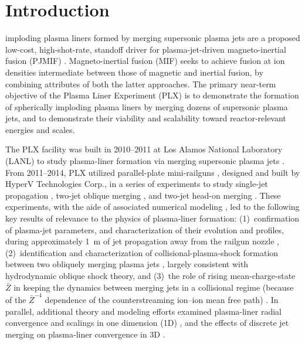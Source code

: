 \documentclass[journal]{IEEEtran}
\begin{document}
\section{Introduction}
% 
% 
% 
% 
 imploding plasma liners formed by merging supersonic
plasma jets are a proposed low-cost, high-shot-rate,
standoff driver for plasma-jet-driven magneto-inertial fusion (PJMIF) \cite{thio99,hsu12ieee,knapp14}.
Magneto-inertial fusion (MIF) \cite{lindemuth83, kirkpatrick95,lindemuth09}
seeks to achieve fusion
at ion densities intermediate between those of magnetic and inertial fusion, by combining attributes of
both the latter approaches.  The primary near-term objective of the
Plasma Liner Experiment (PLX) \cite{hsu12ieee, hsu15jpp} is to demonstrate the formation of
spherically imploding plasma liners by
 merging dozens of supersonic plasma jets, and to demonstrate their viability and scalability toward
 reactor-relevant energies and scales.
 
 The PLX facility was built in 2010--2011 at Los Alamos National Laboratory (LANL) to study plasma-liner
 formation via merging supersonic plasma jets \cite{hsu09,hsu12ieee}.  From 2011--2014, PLX utilized parallel-plate mini-railguns
 \cite{witherspoon11,brockington12baps,case13,messer13}, designed and built by HyperV 
 Technologies Corp., in a series of experiments \cite{hsu15jpp}
 to study single-jet propagation \cite{hsu12pop}, two-jet oblique merging
 \cite{merritt13,merritt14}, and two-jet head-on merging \cite{moser15pop}.  These experiments,
 with the aide of associated numerical modeling \cite{loverich10jfe,merritt13}, led to the following key results of relevance
 to the physics of plasma-liner formation:
 (1)~confirmation of plasma-jet parameters, and characterization of their evolution and profiles,
 during approximately 1~m of jet propagation away from the railgun nozzle \cite{hsu12pop},
 (2)~identification and characterization of collisional-plasma-shock formation between 
 two obliquely merging plasma
 jets \cite{merritt13,merritt14}, largely consistent with hydrodynamic oblique shock theory, and 
 (3)~the role of rising mean-charge-state $\bar{Z}$ in keeping the dynamics between merging jets in a
 collisional regime (because of the $\bar{Z}^{-4}$ dependence of the counterstreaming
 ion--ion mean free path) \cite{moser15pop}.
  In parallel, additional theory and modeling efforts examined plasma-liner radial convergence and
 scalings in one dimension (1D) \cite{cassibry09,samulyak10,awe11,davis12,kim12}, and the effects of discrete jet merging on plasma-liner convergence in 3D \cite{cassibry12,cassibry13,kim13}.
\end{document}

